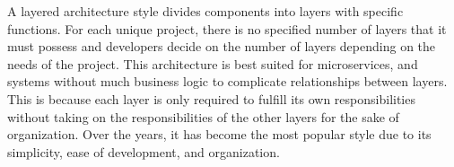 \begin{summary}
    A layered architecture style divides components into layers with specific
    functions. For each unique project, there is no specified number of layers
    that it must possess and developers decide on the number of layers
    depending on the needs of the project. This architecture is best suited for
    microservices, and systems without much business logic to complicate
    relationships between layers.  This is because each layer is only required
    to fulfill its own responsibilities without taking on the responsibilities
    of the other layers for the sake of organization. Over the years, it has
    become the most popular style due to its simplicity, ease of development,
    and organization.  
\end{summary}

